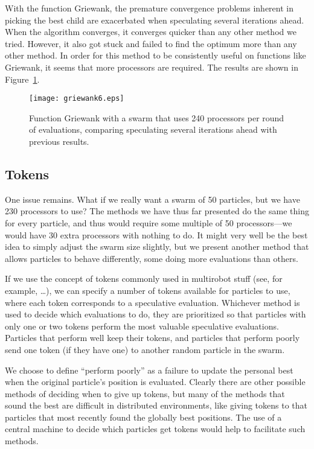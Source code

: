 \documentclass[journal,letterpaper]{IEEEtran}
\newcommand{\fig}[1]{Figure~\ref{fig:#1}}
\begin{document}
With the function Griewank, the premature convergence problems inherent in
picking the best child are exacerbated when speculating several iterations
ahead.  When the algorithm converges, it converges quicker than any other 
method we tried.  However, it also got stuck and failed to find the optimum
more than any other method.  In order for this method to be consistently useful
on functions like Griewank, it seems that more processors are required.  The
results are shown in \fig{griewank-manyiters}.

\begin{figure}
  \centering
  \texttt{[image: griewank6.eps]}
  \caption{Function Griewank with a swarm that uses 240 processors per round of
  evaluations, comparing speculating several iterations ahead with previous
  results.}
  \label{fig:griewank-manyiters}
\end{figure}

\subsection{Tokens}

One issue remains.  What if we really want a swarm of 50 particles, but we have
230 processors to use?  The methods we have thus far presented do the same
thing for every particle, and thus would require some multiple of 50
processors---we would have 30 extra processors with nothing to do.  It might
very well be the best idea to simply adjust the swarm size slightly, but we
present another method that allows particles to behave differently, some doing
more evaluations than others.

If we use the concept of tokens commonly used in multirobot stuff (see, for
example, \dots), we can specify a number of tokens available for particles to
use, where each token corresponds to a speculative evaluation.  Whichever
method is used to decide which evaluations to do, they are prioritized so that
particles with only one or two tokens perform the most valuable speculative
evaluations.  Particles that perform well keep their tokens, and particles that
perform poorly send one token (if they have one) to another random particle in
the swarm.

We choose to define ``perform poorly'' as a failure to update the personal best
when the original particle's position is evaluated.  Clearly there are other
possible methods of deciding when to give up tokens, but many of the methods
that sound the best are difficult in distributed environments, like giving
tokens to that particles that most recently found the globally best positions.
The use of a central machine to decide which particles get tokens would help to
facilitate such methods.
\end{document}
